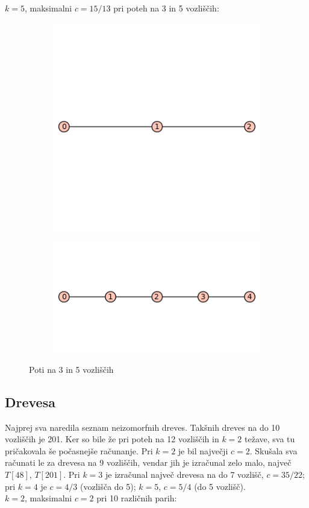 \documentclass[12pt, a4paper]{article}
\begin{document}
$k=5$, maksimalni $c=15/13$ pri poteh na 3 in 5 vozliščih: 
\begin{figure}[!htb]
\centering
\begin{subfigure}{0.5\textwidth}
  \centering
  \includegraphics[width=0.5\linewidth]{3-pot}
\end{subfigure}%
\begin{subfigure}{0.5\textwidth}
  \centering
  \includegraphics[width=0.5\linewidth]{5-pot}
\end{subfigure}
\caption{Poti na 3 in 5 vozliščih}
\label{fig:test}
\end{figure}
\clearpage

\subsection{Drevesa}
Najprej sva naredila seznam neizomorfnih dreves. Takšnih dreves na do 10 vozliščih je 201. Ker so bile že pri poteh na 12 vozliščih in $k=2$ težave, sva tu pričakovala še počasnejše računanje. Pri $k=2$ je bil največji $c=2$. Skušala sva računati le za drevesa na 9 vozliščih, vendar jih je izračunal zelo malo, največ $T[48]$, $T[201]$. Pri $k=3$ je izračunal največ drevesa na do 7 vozlišč, $c=35/22$; pri $k=4$ je $c=4/3$ (vozlišča do 5); $k=5$, $c=5/4$ (do 5 vozlišč). \\

$k=2$, maksimalni $c=2$ pri 10 različnih parih:
\end{document}
